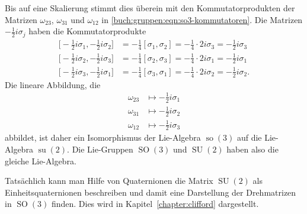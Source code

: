 Bis auf eine Skalierung stimmt dies überein mit den Kommutatorprodukten
der Matrizen $\omega_{23}$, $\omega_{31}$ und $\omega_{12}$
in \eqref{buch:gruppen:eqn:so3-kommutatoren}.
Die Matrizen $-\frac12i\sigma_j$ haben die Kommutatorprodukte
\begin{align*}
\bigl[-{\textstyle\frac12}i\sigma_1,-{\textstyle\frac12}i\sigma_2\bigr]
&=
-{\textstyle\frac14}[\sigma_1,\sigma_2]
=
-{\textstyle\frac14}\cdot 2i\sigma_3
=
-{\textstyle\frac12}i\sigma_3
\\
\bigl[-{\textstyle\frac12}i\sigma_2,-{\textstyle\frac12}i\sigma_3\bigr]
&=
-{\textstyle\frac14}[\sigma_2,\sigma_3]
=
-{\textstyle\frac14}\cdot 2i\sigma_1
=
-{\textstyle\frac12}i\sigma_1
\\
\bigl[-{\textstyle\frac12}i\sigma_3,-{\textstyle\frac12}i\sigma_1\bigr]
&=
-{\textstyle\frac14}[\sigma_3,\sigma_1]
=
-{\textstyle\frac14}\cdot 2i\sigma_2
=
-{\textstyle\frac12}i\sigma_2.
\end{align*}
Die lineare Abbildung, die
\begin{align*}
\omega_{23}&\mapsto -{\textstyle\frac12}i\sigma_1\\
\omega_{31}&\mapsto -{\textstyle\frac12}i\sigma_2\\
\omega_{12}&\mapsto -{\textstyle\frac12}i\sigma_3
\end{align*}
abbildet, ist daher ein Isomorphismus der Lie-Algebra $\operatorname{so}(3)$
auf die Lie-Algebra $\operatorname{su}(2)$.
Die Lie-Gruppen $\operatorname{SO}(3)$ und $\operatorname{SU}(2)$
haben also die gleiche Lie-Algebra.

Tatsächlich kann man Hilfe von Quaternionen die Matrix $\operatorname{SU}(2)$
als Einheitsquaternionen beschreiben und damit eine Darstellung der
Drehmatrizen in $\operatorname{SO}(3)$ finden.
Dies wird in Kapitel~\ref{chapter:clifford} dargestellt.





